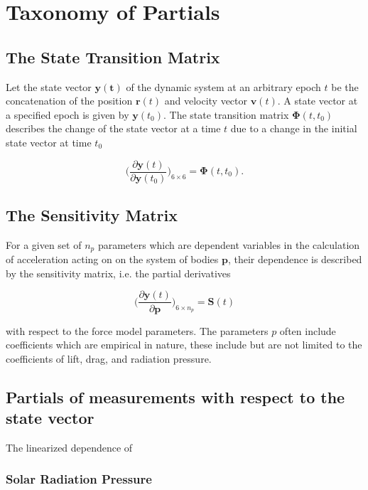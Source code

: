 
\section{Taxonomy of Partials}

\subsection{The State Transition Matrix}

Let the state vector $\mathbf{y(t)}$ of the dynamic system at an arbitrary epoch
$t$ be the concatenation of the position $\mathbf{r}(t)$ and velocity vector
$\mathbf{v}(t)$. A state vector at a specified epoch is given by
$\mathbf{y}(t_0)$. The state transition matrix $\bm{\Phi}(t,t_0)$ describes the
change of the state vector at a time $t$ due to a change in the initial state
vector at time $t_0$

\begin{equation}
    \bigg(\frac{\partial\mathbf{y}(t)}{\partial{\mathbf{y}(t_0)}}\bigg)_{6\times{6}}=\bm{\Phi}(t, t_0).
    \label{eq:linear_stm}
\end{equation}

\subsection{The Sensitivity Matrix}

For a given set of $n_p$ parameters which are dependent variables in
the calculation of acceleration acting on on the system of bodies $\mathbf{p}$,
their dependence is described by the sensitivity matrix, i.e. the partial
derivatives

\begin{equation}
    \bigg(\frac{\partial\mathbf{y}(t)}{\partial{\mathbf{p}}}\bigg)_{6\times{n_p}}=\bm{S}(t)
\end{equation}

with respect to the force model parameters. The parameters $p$ often include
coefficients which are empirical in nature, these include but are not limited to
the coefficients of lift, drag, and radiation pressure.

\subsection{Partials of measurements with respect to the state vector}
The linearized dependence of

\subsubsection{Solar Radiation Pressure}

